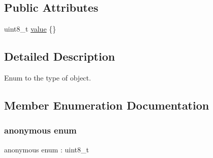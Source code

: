 \subsection*{Public Attributes}
\begin{DoxyCompactItemize}
\item 
uint8\+\_\+t \hyperlink{structmaf__perception__interface_1_1ObjectTypePropertyEnum_abaabb52cedfa7a64b63b5c4a2b8fecd3}{value} \{\}
\end{DoxyCompactItemize}


\subsection{Detailed Description}
Enum to the type of object. 

\subsection{Member Enumeration Documentation}
\mbox{\label{structmaf__perception__interface_1_1ObjectTypePropertyEnum_af86073a70f72918c764ad4330f2c4739}} 
\subsubsection{\texorpdfstring{anonymous enum}{anonymous enum}}
{\footnotesize\ttfamily anonymous enum \+: uint8\+\_\+t}


